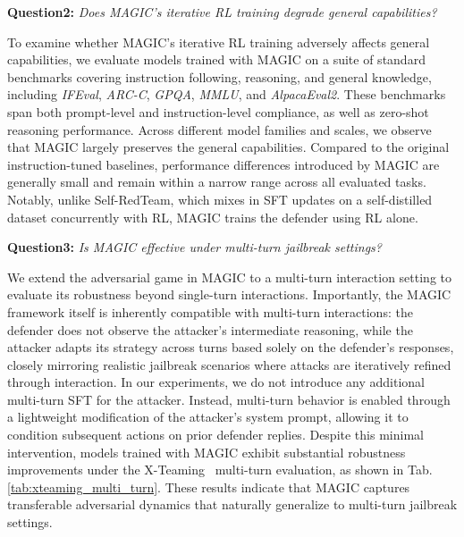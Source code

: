 \documentclass[11pt, letterpaper]{template}
\theoremstyle{plain}
\theoremstyle{definition}
\theoremstyle{remark}
\begin{document}
\begin{rqbox}
\textbf{Question2:} \textit{Does MAGIC’s iterative RL training degrade general capabilities?}
\end{rqbox}
To examine whether MAGIC’s iterative RL training adversely affects general capabilities, we evaluate models trained with MAGIC on a suite of standard benchmarks covering instruction following, reasoning, and general knowledge, including \textit{IFEval}, \textit{ARC-C}, \textit{GPQA}, \textit{MMLU}, and \textit{AlpacaEval2}. These benchmarks span both prompt-level and instruction-level compliance, as well as zero-shot reasoning performance. Across different model families and scales, we observe that MAGIC largely preserves the general capabilities. Compared to the original instruction-tuned baselines, performance differences introduced by MAGIC are generally small and remain within a narrow range across all evaluated tasks. Notably, unlike Self-RedTeam, which mixes in SFT updates on a self-distilled dataset concurrently with RL, MAGIC trains the defender using RL alone.

\begin{rqbox}
\textbf{Question3:} \textit{Is MAGIC effective under multi-turn jailbreak settings?}
\end{rqbox}

We extend the adversarial game in MAGIC to a multi-turn interaction setting to evaluate its robustness beyond single-turn interactions. Importantly, the MAGIC framework itself is inherently compatible with multi-turn interactions: the defender does not observe the attacker’s intermediate reasoning, while the attacker adapts its strategy across turns based solely on the defender’s responses, closely mirroring realistic jailbreak scenarios where attacks are iteratively refined through interaction. In our experiments, we do not introduce any additional multi-turn SFT for the attacker. Instead, multi-turn behavior is enabled through a lightweight modification of the attacker’s system prompt, allowing it to condition subsequent actions on prior defender replies. Despite this minimal intervention, models trained with MAGIC exhibit substantial robustness improvements under the X-Teaming~\citep{rahman2025xteaming} multi-turn evaluation, as shown in Tab.\ref{tab:xteaming_multi_turn}. These results indicate that MAGIC captures transferable adversarial dynamics that naturally generalize to multi-turn jailbreak settings.
\end{document}
